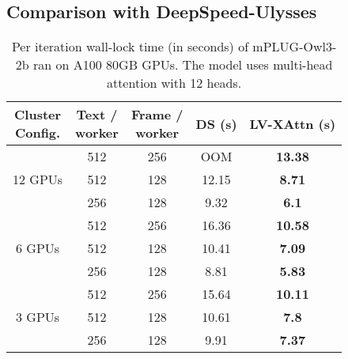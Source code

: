 \subsection{Comparison with DeepSpeed-Ulysses}
\begin{table}[tb]
\centering
\caption{Per iteration wall-lock time (in seconds) of mPLUG-Owl3-2b ran on A100 80GB GPUs. The model uses multi-head attention with 12 heads.}
\begin{tabular}{|c|cc|c|c|} \hline
\makecell{Cluster\\Config.} & \makecell{Text /\\worker}& \makecell{Frame /\\worker} & DS (s) & LV-XAttn (s) \\ \hline
\multirow{3}{*}{12 GPUs} & 512 & 256 & OOM   & \textbf{13.38} \\ 
& 512 & 128 & 12.15 & \textbf{8.71} \\ 
& 256 & 128 & 9.32  & \textbf{6.1} \\ \hline
\multirow{3}{*}{6 GPUs}  & 512 & 256 & 16.36 & \textbf{10.58} \\ 
& 512 & 128 & 10.41 & \textbf{7.09} \\ 
& 256 & 128 & 8.81  & \textbf{5.83} \\ \hline
\multirow{3}{*}{3 GPUs}  & 512 & 256 & 15.64 & \textbf{10.11} \\ 
 & 512 & 128 & 10.61 & \textbf{7.8} \\ 
 & 256 & 128 & 9.91  & \textbf{7.37} \\
\hline
\end{tabular}
\label{tab:ds-owl}
\end{table}

